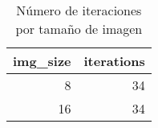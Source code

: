 \begin{table}
\caption{Número de iteraciones por tamaño de imagen}
\label{tab:iteraciones}
\begin{tabular}{rr}
\toprule
img_size & iterations \\
\midrule
8 & 34 \\
16 & 34 \\
\bottomrule
\end{tabular}
\end{table}

